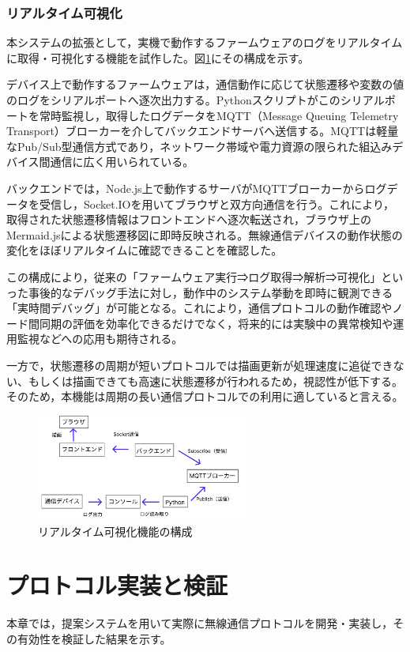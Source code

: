 \documentclass[technicalreport]{ieicej}
\begin{document}
\subsubsection{リアルタイム可視化}
本システムの拡張として，実機で動作するファームウェアのログをリアルタイムに取得・可視化する機能を試作した。図\ref{fig:realtime-structure}にその構成を示す。

デバイス上で動作するファームウェアは，通信動作に応じて状態遷移や変数の値のログをシリアルポートへ逐次出力する。Pythonスクリプトがこのシリアルポートを常時監視し，取得したログデータをMQTT（Message Queuing Telemetry Transport）ブローカーを介してバックエンドサーバへ送信する。MQTTは軽量なPub/Sub型通信方式であり，ネットワーク帯域や電力資源の限られた組込みデバイス間通信に広く用いられている\cite{MQTT}。

バックエンドでは，Node.js上で動作するサーバがMQTTブローカーからログデータを受信し，Socket.IOを用いてブラウザと双方向通信を行う。これにより，取得された状態遷移情報はフロントエンドへ逐次転送され，ブラウザ上のMermaid.jsによる状態遷移図に即時反映される。無線通信デバイスの動作状態の変化をほぼリアルタイムに確認できることを確認した。

この構成により，従来の「ファームウェア実行⇒ログ取得⇒解析⇒可視化」といった事後的なデバッグ手法に対し，動作中のシステム挙動を即時に観測できる「実時間デバッグ」が可能となる。これにより，通信プロトコルの動作確認やノード間同期の評価を効率化できるだけでなく，将来的には実験中の異常検知や運用監視などへの応用も期待される。

一方で，状態遷移の周期が短いプロトコルでは描画更新が処理速度に追従できない、もしくは描画できても高速に状態遷移が行われるため，視認性が低下する。そのため，本機能は周期の長い通信プロトコルでの利用に適していると言える。

\begin{figure}[h]
\centering
\includegraphics[width=70mm]{./images/realtime.pdf}
\caption{リアルタイム可視化機能の構成}
\label{fig:realtime-structure}
\end{figure}

\section{プロトコル実装と検証}
本章では，提案システムを用いて実際に無線通信プロトコルを開発・実装し，その有効性を検証した結果を示す。
\end{document}
